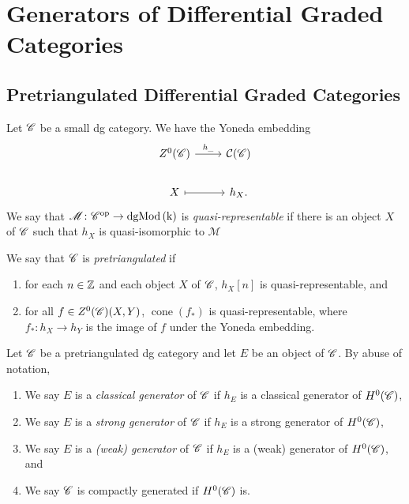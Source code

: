 \documentclass[dissertation.tex]{subfiles}
\begin{document}
\section{Generators of Differential Graded Categories}
\subsection{Pretriangulated Differential Graded Categories}

\begin{defn}
  Let $\mathscr{C}$ be a small dg category.
  We have the Yoneda embedding 
  $$\begin{tikzcd}
    Z^0(\CC) \arrow{r}{h_{\_}} & \mathcal{C}(\CC)\\
    X \arrow[mapsto]{r} & h_X.
  \end{tikzcd}$$
  We say that $\mathscr{M} \colon \mathscr{C}^\text{op} \rightarrow \operatorname{dgMod\left(k\right)}$ is {\it quasi-representable} if there is an object $X$ of $\mathscr{C}$ such that $h_X$ is quasi-isomorphic to $\mathscr{M}$
  
  We say that $\mathscr{C}$ is {\it pretriangulated} if
  \begin{enumerate}
  \item
    for each $n \in \mathbb{Z}$ and each object $X$ of $\mathscr{C}$, $h_X[n]$ is quasi-representable, and
  \item
    for all $f \in Z^0(\mathscr{C})(X,Y)$, $\operatorname{cone}(f_*)$ is quasi-representable, where $f_* : h_X \rightarrow h_Y$ is the image of $f$ under the Yoneda embedding.
  \end{enumerate}
\end{defn}

\begin{defn}
  Let $\mathscr{C}$ be a pretriangulated dg category and let $E$ be an object of $\mathscr{C}$.
  By abuse of notation, 
  \begin{enumerate}
  \item
    We say $E$ is a {\it classical generator} of $\mathscr{C}$ if $h_E$ is a classical generator of $H^0(\mathscr{C})$,
  \item
    We say $E$ is a {\it strong generator} of $\mathscr{C}$ if $h_E$ is a strong generator of $H^0(\mathscr{C})$,
  \item
    We say $E$ is a {\it (weak) generator} of $\mathscr{C}$ if $h_E$ is a (weak) generator of $H^0(\mathscr{C})$, and
  \item
    We say $\mathscr{C}$ is compactly generated if $H^0(\mathscr{C})$ is.
  \end{enumerate}
\end{defn}
\end{document}
